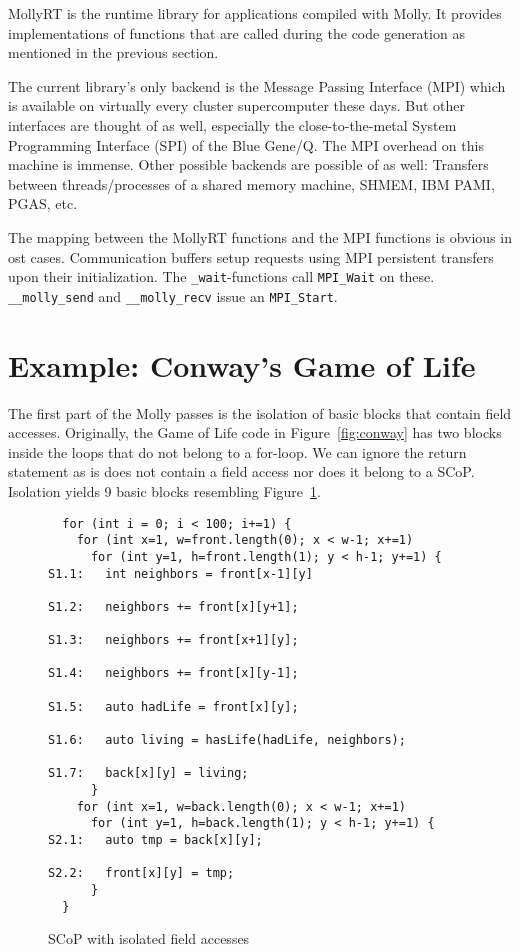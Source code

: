 \documentclass{sigplanconf}
\begin{document}
MollyRT is the runtime library for applications compiled with Molly. It provides implementations of functions that are called during the code generation as mentioned in the previous section.

The current library's only backend is the Message Passing Interface (MPI) which is available on virtually every cluster supercomputer these days. But other interfaces are thought of as well, especially the close-to-the-metal System Programming Interface (SPI) of the Blue Gene/Q. The MPI overhead on this machine is immense. Other possible backends are possible of as well: Transfers between threads/processes of a shared memory machine, SHMEM, IBM PAMI, PGAS, etc.

The mapping between the MollyRT functions and the MPI functions is obvious in ost cases. Communication buffers setup requests using MPI persistent transfers upon their initialization. The \texttt{\_wait}-functions call \texttt{MPI\_Wait} on these. \texttt{\_\_molly\_send} and \texttt{\_\_molly\_recv} issue an \texttt{MPI\_Start}.


\section{Example: Conway's Game of Life}\label{sct:conways}

The first part of the Molly passes is the isolation of basic blocks that contain field accesses. Originally, the Game of Life code in Figure~\ref{fig:conway} has two blocks inside the loops that do not belong to a for-loop. We can ignore the return statement as is does not contain a field access nor does it belong to a SCoP. Isolation yields 9 basic blocks resembling Figure~\ref{fig:isolated}.

\begin{figure}[htb]
{\small
\begin{verbatim}
  for (int i = 0; i < 100; i+=1) {
    for (int x=1, w=front.length(0); x < w-1; x+=1)
      for (int y=1, h=front.length(1); y < h-1; y+=1) {
S1.1:   int neighbors = front[x-1][y] 

S1.2:   neighbors += front[x][y+1];
         
S1.3:   neighbors += front[x+1][y];
        
S1.4:   neighbors += front[x][y-1];  
         
S1.5:   auto hadLife = front[x][y];
         
S1.6:   auto living = hasLife(hadLife, neighbors);  
            
S1.7:   back[x][y] = living;       
      }
    for (int x=1, w=back.length(0); x < w-1; x+=1)
      for (int y=1, h=back.length(1); y < h-1; y+=1) {
S2.1:   auto tmp = back[x][y];
      
S2.2:   front[x][y] = tmp;
      }
  }
\end{verbatim}
}
\caption{SCoP with isolated field accesses}\label{fig:isolated}
\end{figure}
\end{document}
